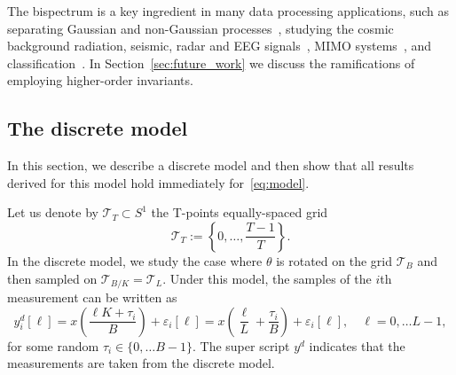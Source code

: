 \documentclass[english,12pt]{article}
\newcommand{\T}{\mathcal{T}}
\newcommand{\TODO}[1]{{\color{red}{[#1]}}}
\numberwithin{equation}{section}
\numberwithin{thm}{section} %
\begin{document}
The bispectrum is a key ingredient in many data processing applications, such as separating Gaussian and non-Gaussian processes~\cite{brockett1988bispectral}, studying the cosmic background
radiation, seismic, radar and EEG signals~\cite{wang2000cosmic,chen2008feature,ning1989bispectral}, MIMO systems~\cite{chen2001frequency}, and classification~\cite{zhao2014rotationally}.  
In Section~\ref{sec:future_work} we discuss the ramifications of employing higher-order invariants.  

\TODO{The invariants can be easily estimated from the data + bias}


\subsection{The discrete model} \label{sec:discrete_analysis}

In this section, we describe a discrete model and then show that all results derived for this model hold immediately for~\eqref{eq:model}.

Let us denote by $\T_T\subset S^1$ the T-points equally-spaced grid 
 \begin{equation} \label{eq:grid}
 \mathcal{T}_T:=\left\{0,\ldots,\frac{T-1}{T}\right\}.
 \end{equation}
 In the discrete model, we study the case where $\theta$ is rotated on the grid $\T_B$ and then sampled on $\T_{B/K}=\T_{L}$.
 Under this model, the samples of the $i$th measurement can be  written as
 \begin{equation} \label{eq:discrete_model}
 y_i^d[\ell] = x\left(\frac{\ell K+\tau_i}{B}\right) + \varepsilon_i[\ell]=x\left(\frac{\ell}{L} + \frac{\tau_i}{B}\right)+\varepsilon_i[\ell], \quad \ell=0,\ldots L-1,
 \end{equation}
 for some random $\tau_i\in\{0,\ldots B-1\}$. The super script $y^d$ indicates that the measurements are taken from the discrete model. 
\end{document}
